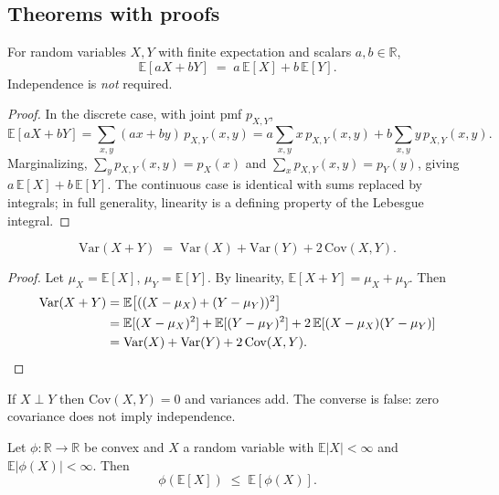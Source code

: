 \subsection*{Theorems with proofs}

\begin{theorem}
For random variables $X, Y$ with finite expectation and scalars $a, b\in\mathbb{R}$,
\[
\mathbb{E}[aX + bY] \;=\; a\,\mathbb{E}[X] + b\,\mathbb{E}[Y].
\]
Independence is \emph{not} required.
\end{theorem}

\begin{proof}
In the discrete case, with joint pmf $p_{X,Y}$,
\[
\mathbb{E}[aX+bY] = \sum_{x,y}(ax+by)\,p_{X,Y}(x,y) = a\sum_{x,y} x\,p_{X,Y}(x,y) + b\sum_{x,y} y\,p_{X,Y}(x,y).
\]
Marginalizing, $\sum_y p_{X,Y}(x,y) = p_X(x)$ and $\sum_x p_{X,Y}(x,y) = p_Y(y)$, giving $a\,\mathbb{E}[X] + b\,\mathbb{E}[Y]$. The continuous case is identical with sums replaced by integrals; in full generality, linearity is a defining property of the Lebesgue integral.
\end{proof}

\begin{theorem}
\[
\mathrm{Var}(X+Y) \;=\; \mathrm{Var}(X) + \mathrm{Var}(Y) + 2\,\mathrm{Cov}(X,Y).
\]
\end{theorem}

\begin{proof}
Let $\mu_X = \mathbb{E}[X]$, $\mu_Y = \mathbb{E}[Y]$. By linearity, $\mathbb{E}[X+Y] = \mu_X + \mu_Y$. Then
\begin{align*}
\mathrm{Var}(X+Y) &= \mathbb{E}\!\left[((X-\mu_X)+(Y-\mu_Y))^2\right] \\
&= \mathbb{E}[(X-\mu_X)^2] + \mathbb{E}[(Y-\mu_Y)^2] + 2\,\mathbb{E}[(X-\mu_X)(Y-\mu_Y)] \\
&= \mathrm{Var}(X) + \mathrm{Var}(Y) + 2\,\mathrm{Cov}(X,Y). \qedhere
\end{align*}
\end{proof}

\begin{remark}
If $X\perp Y$ then $\mathrm{Cov}(X,Y)=0$ and variances add. The converse is false: zero covariance does not imply independence.
\end{remark}

\begin{theorem}
Let $\phi:\mathbb{R}\to\mathbb{R}$ be convex and $X$ a random variable with $\mathbb{E}|X|<\infty$ and $\mathbb{E}|\phi(X)|<\infty$. Then
\[
\phi(\mathbb{E}[X]) \;\le\; \mathbb{E}[\phi(X)].
\]
\end{theorem}

